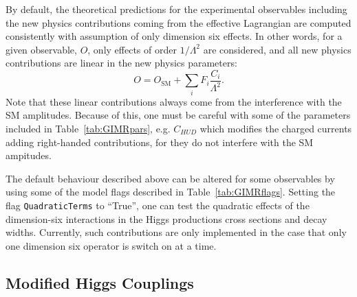 \documentclass[preprint,3p,12pt]{elsarticle}
\begin{document}
By default, the theoretical predictions for the experimental observables including the new physics contributions coming from the effective Lagrangian are computed consistently with assumption of only dimension six effects. In other words, for a given observable, $O$, only effects of order $1/\Lambda^2$ are considered, and all new physics contributions are linear in the new physics parameters:
%
\begin{equation}
O=O_{\mathrm{SM}}+ \sum_i F_i \frac{C_i}{\Lambda^2}.
\label{eq:Odim6}
\end{equation}
%
Note that these linear contributions always come from the interference with the SM amplitudes. Because of this, one must be careful with some of the parameters included in Table~\ref{tab:GIMRpars}, e.g. $C_{HUD}$ which modifies the charged currents adding right-handed contributions, for they do not interfere with the SM ampitudes. 

The default behaviour described above can be altered for some observables by using some of the model flags described in Table~\ref{tab:GIMRflags}. Setting the flag {\tt QuadraticTerms} to ``True'', one can test the quadratic effects of the dimension-six interactions in the Higgs productions cross sections and decay widths. Currently, such contributions are only implemented in the case that only one dimension six operator is switch on at a time. 

\subsection{Modified Higgs Couplings}
\label{sec:Higgs}
\end{document}
